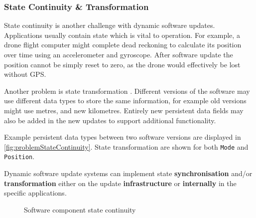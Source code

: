 \clearpage

\subsubsection{State Continuity \& Transformation} \label{sec:state}

State continuity is another challenge with dynamic software updates. Applications usually contain state which is vital to operation. For example, a drone flight computer might complete dead reckoning to calculate its position over time using an accelerometer and gyroscope. After software update the position cannot be simply reset to zero, as the drone would effectively be lost without GPS.

Another problem is state transformation \autocite{seifzadehSurveyDynamicSoftware2013}. Different versions of the software may use different data types to store the same information, for example old versions might use metres, and new kilometres. Entirely new persistent data fields may also be added in the new updates to support additional functionality.

Example persistent data types between two software versions are displayed in \autoref{fig:problemStateContinuity}. State transformation are shown for both \verb|Mode| and \verb|Position|. 

Dynamic software update systems can implement state \textbf{synchronisation} and/or \textbf{transformation} either on the update \textbf{infrastructure} or \textbf{internally} in the specific applications.

\begin{figure}[ht]
    \centering
    \caption[Software component state continuity]
    {Software component state continuity}
    \label{fig:problemStateContinuity}
\end{figure}

